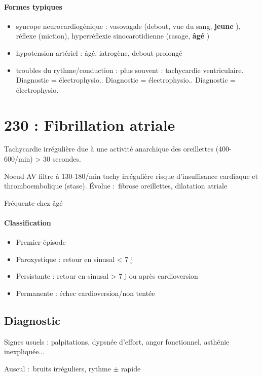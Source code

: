 \documentclass{article}
\begin{document}
\paragraph{Formes typiques}
\begin{itemize}
  \item syncope neurocardiogénique : vasovagale (debout, vue du sang,
    \textbf{jeune} ), réflexe
    (miction), hyperréflexie sinocarotidienne (rasage, \textbf{âgé} )
  \item hypotension artériel : âgé, iatrogène, debout prolongé
  \item troubles du rythme/conduction : plus souvent : tachycardie
    ventriculaire. Diagnostic = électrophysio.. Diagnostic = électrophysio..
    Diagnostic = électrophysio.
\end{itemize}

\section{230 : Fibrillation atriale}%
\label{sec:230_fibrillation_atriale}

Tachycardie irrégulière due à une activité anarchique des oreillettes
(400-600/min) > 30 secondes.

Noeud AV filtre à 130-180/min \thus tachy irrégulière \thus risque
d'insuffisance cardiaque et thromboembolique (stase). Évolue : fibrose
oreillettes, dilatation atriale

Fréquente chez âgé

\paragraph{Classification}
\begin{itemize}
  \item Premier épisode
  \item Paroxystique : retour en sinusal < 7 j
  \item Persistante :  retour en sinusal > 7 j ou après cardioversion
  \item Permanente : échec cardioversion/non tentée
\end{itemize}

\subsection{Diagnostic}
Signes usuels : palpitations, dypsnée d'effort, angor fonctionnel, asthénie
inexpliquée...

Auscul : bruits irréguliers, rythme $\pm$ rapide
\end{document}
